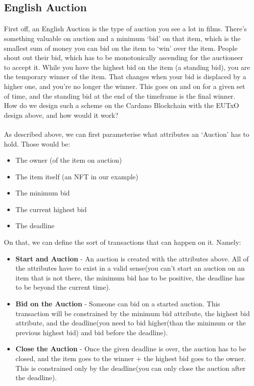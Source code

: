 \documentclass[a4paper, 11pt]{article}
\begin{document}
    \subsection{English Auction}
    
    \paragraph{} First off, an English Auction is the type of auction you see a lot in films. There's something valuable on auction and a minimum `bid' on that item, which is the smallest sum of money you can bid on the item to `win' over the item. People shout out their bid, which has to be monotonically ascending for the auctioneer to accept it. While you have the highest bid on the item (a standing bid), you are the temporary winner of the item. That changes when your bid is displaced by a higher one, and you're no longer the winner. This goes on and on for a given set of time, and the standing bid at the end of the timeframe is the final winner. How do we design such a scheme on the Cardano Blockchain with the EUTxO design above, and how would it work?

    \paragraph{} As described above, we can first parameterise what attributes an `Auction' has to hold. Those would be:

    \begin{itemize}
        \item The owner (of the item on auction)
        \item The item itself (an NFT in our example)
        \item The minimum bid
        \item The current highest bid
        \item The deadline
    \end{itemize}

    On that, we can define the sort of transactions that can happen on it. Namely:
    \begin{itemize}
        \item \textbf{Start and Auction} - An auction is created with the attributes above. All of the attributes have to exist in a valid sense(you can't start an auction on an item that is not there, the minimum bid has to be positive, the deadline has to be beyond the current time).
        \item \textbf{Bid on the Auction} - Someone can bid on a started auction. This transaction will be constrained by the minimum bid attribute, the highest bid attribute, and the deadline(you need to bid higher(than the minimum or the previous highest bid) and bid before the deadline).
        \item \textbf{Close the Auction} - Once the given deadline is over, the auction has to be closed, and the item goes to the winner + the highest bid goes to the owner. This is constrained only by the deadline(you can only close the auction after the deadline).
    \end{itemize} 
\end{document}
